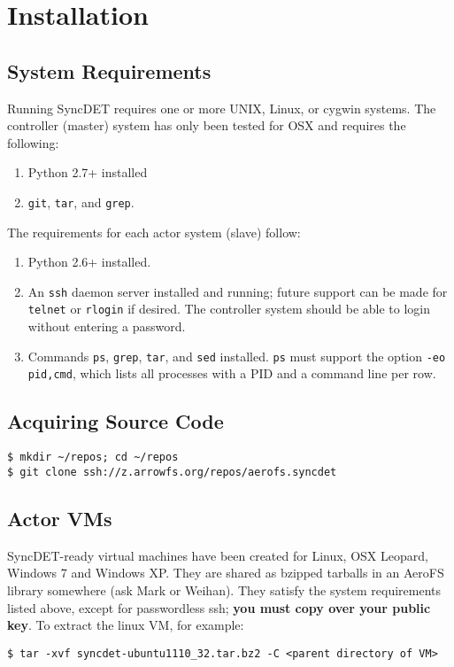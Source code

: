 \section{Installation}

\subsection{System Requirements}

Running SyncDET requires one or more UNIX, Linux, or cygwin systems. 
The controller (master) system has only been tested for OSX and requires the
following:
\begin{enumerate}
\item Python 2.7+ installed
\item {\tt git}, {\tt tar}, and {\tt grep}.
\end{enumerate}
The requirements for each actor system (slave) follow:
\begin{enumerate}
\item Python 2.6+ installed.
\item An {\tt ssh} daemon server installed and running; future support can be made for
{\tt telnet} or {\tt rlogin} if desired. The controller system should be able to login
without entering a password.
\item Commands {\tt ps}, {\tt grep}, {\tt tar}, and {\tt sed} installed. {\tt ps} must
support the option {\tt -eo pid,cmd}, which lists all processes with a PID and a
command line per row.
\end{enumerate}

\subsection{Acquiring Source Code}
\begin{verbatim}
$ mkdir ~/repos; cd ~/repos
$ git clone ssh://z.arrowfs.org/repos/aerofs.syncdet
\end{verbatim}

\subsection{Actor VMs}
SyncDET-ready virtual machines have been created for Linux, OSX Leopard, Windows
7 and Windows XP. They are shared as bzipped tarballs in an AeroFS library
somewhere (ask Mark or Weihan). They satisfy the system requirements listed
above, except for passwordless ssh; {\bf you must copy over your public key}. To
extract the linux VM, for example:
\begin{verbatim}
$ tar -xvf syncdet-ubuntu1110_32.tar.bz2 -C <parent directory of VM>
\end{verbatim}

